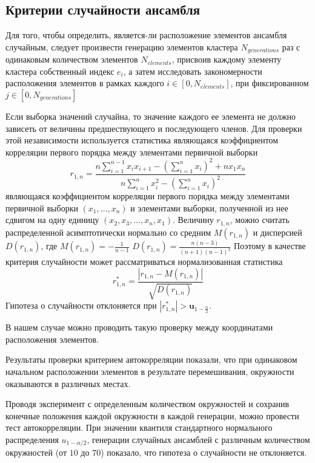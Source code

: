 \subsection{Критерии случайности ансамбля}

Для того, чтобы определить, является-ли расположение элементов ансамбля случайным, следует произвести генерацию элементов кластера $N_{generations}$ раз с одинаковым количеством элементов $N_{elements}$, присвоив каждому элементу кластера собственный индекс $e_{i}$, а затем исследовать закономерности расположения элементов в рамках каждого $i \in [0, N_{elements}]$, при фиксированном $j \in [0, N_{generations}]$ 

Если выборка значений случайна, то значение каждого ее элемента не должно зависеть от величины предшествующего и последующего членов. Для проверки этой независимости используется статистика являющаяся коэффициентом корреляции первого порядка
между элементами первичной выборки 
$$
r_{1, n}=\frac{n \sum_{i=1}^{n-1} x_{i} x_{i+1}-\left(\sum_{i=1}^{n} x_{i}\right)^{2}+n x_{1} x_{n}}{n \sum_{i=1}^{n} x_{i}^{2}-\left(\sum_{i=1}^{n} x_{i}\right)^{2}}
$$
являющаяся коэффициентом корреляции первого порядка
между элементами первичной выборки $ \left(x_{1}, \ldots, x_{n}\right) $ и элементами выборки, полученной из нее сдвигом на одну единицу $\left(x_{2}, x_{3}, \ldots, x_{n}, x_{1}\right)$. Величину $r_{1, n}$,
можно считать распределенной асимптотически нормально со средним $M\left(r_{1, n}\right)$ и дисперсией $D\left(r_{1, n}\right)$, где $M\left(r_{1, n}\right)=-\frac{1}{n-1}$ \newline
$D\left(r_{1, n}\right)=\frac{n(n-3)}{(n+1)(n-1)^{2}}$ Поэтому в качестве критерия случайности может рассматриваться нормализованная статистика 
$$
r_{1, n}^{*}=\frac{\left|r_{1, n}-M\left(r_{1, n}\right)\right|}{\sqrt{D\left(r_{1, n}\right)}}
$$ 
Гипотеза о случайности отклоняется при $\left|r_{1, n}^{*}\right|>\boldsymbol{u}_{1-\frac{\alpha}{2}}$.

В нашем случае можно проводить такую проверку между координатами расположения элементов.

Результаты проверки критерием автокорреляции показали, что при одинаковом начальном расположении элементов в результате перемешивания, окружности оказываются в различных местах.

Проводя эксперимент с определенным количеством окружностей и сохранив конечные положения каждой окружности в каждой генерации, можно провести тест автокорреляции. При значении квантиля стандартного нормального распределения $u_{1-\alpha/2}$, генерации случайных ансамблей с различным количеством окружностей (от $10$ до $70$) показало, что гипотеза о случайности не отклоняется. 

